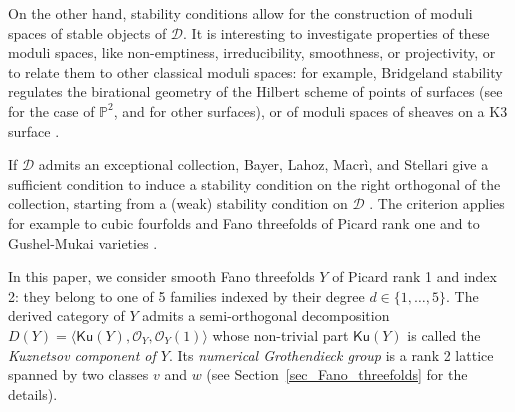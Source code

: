 \documentclass[11pt]{amsart}
\theoremstyle{definition}
\newcommand{\pr}[1]{\mathbb P^{#1}}
\newcommand{\sO}{\mathcal{O}}
\newcommand{\sD}{\mathcal{D}}
\newcommand{\Ku}{\mathsf{Ku}}
\begin{document}
 
On the other hand, stability conditions allow for the construction of moduli spaces of stable objects of $\sD$. It is interesting to investigate properties of these moduli spaces, like non-emptiness, irreducibility, smoothness, or projectivity, or to relate them to other classical moduli spaces: for example, Bridgeland stability regulates the birational geometry of the Hilbert scheme of points of surfaces (see \cite{ABCH13} for the case of $\pr 2$, and \cite{BC13} for other surfaces), or of moduli spaces of sheaves on a K3 surface \cite{BM14_K3}.

If $\sD$ admits an exceptional collection, Bayer, Lahoz, Macr\`i, and Stellari give a sufficient condition to induce a stability condition on the right orthogonal of the collection, starting from a (weak) stability condition on $\sD$ \cite{BLMS17}. The criterion applies for example to cubic fourfolds and Fano threefolds of Picard rank one \cite{BLMS17} and to Gushel-Mukai varieties \cite{PPZ19}.

\medskip

In this paper, we consider smooth Fano threefolds $Y$ of Picard rank 1 and index 2: they belong to one of 5 families indexed by their degree $d\in\{1,\ldots,5\}$.
The derived category of $Y$ admits a semi-orthogonal decomposition $ D(Y)=\langle \Ku(Y), \sO_Y, \sO_Y(1) \rangle $ whose non-trivial part $\Ku(Y)$ is called the \textit{Kuznetsov component of $Y$}. Its \emph{numerical Grothendieck group} is a rank 2 lattice spanned by two classes $v$ and $w$ (see Section~\ref{sec_Fano_threefolds} for the details). %
\end{document}
